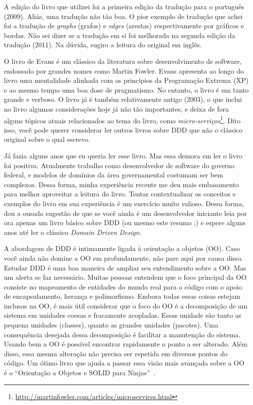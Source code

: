 \documentclass[a4paper, 12pt]{article}
\newcommand{\ddd}{\emph{Domain Driven Design}\xspace}
\begin{document}
A edição do livro que utilizei foi a primeira edição da tradução para o português (2009). Aliás, uma tradução não tão boa. O pior exemplo de tradução que achei foi a tradução de \emph{graphs} (grafos) e \emph{edges} (arestas) respectivamente por gráficos e bordas. Não sei dizer se a tradução em si foi melhorada na segunda edição da tradução (2011). Na dúvida, sugiro a leitura do original em inglês.

O livro de Evans é um clássico da literatura sobre desenvolvimento de software, endossado por grandes nomes como Martin Fowler. Evans apresenta ao longo do livro uma mentalidade alinhada com os princípios da Programação Extrema (XP) e ao mesmo tempo uma boa dose de pragmatismo. No entanto, o livro é um tanto grande e verboso. O livro já é também relativamente antigo (2003), o que inclui no livro algumas considerações hoje já não tão importantes, e deixa de fora alguns tópicos atuais relacionados ao tema do livro, como \emph{micro-serviços}\footnote{\url{http://martinfowler.com/articles/microservices.html}}. Dito isso, você pode querer considerar ler outros livros sobre DDD que não o clássico original sobre o qual escrevo.

Já fazia alguns anos que eu queria ler esse livro. Mas essa demora em ler o livro foi positiva. Atualmente trabalho como desenvolvedor de software do governo federal, e modelos de domínios da área governamental costumam ser bem complexos. Dessa forma, minha experiência recente me deu mais embasamento para melhor aproveitar a leitura do livro. Tentar contextualizar os conceitos e exemplos do livro em sua experiência é um exercício muito valioso. Dessa forma, dou a ousada sugestão de que se você ainda é um desenvolvedor iniciante leia por ora apenas um livro básico sobre DDD (ou mesmo este resumo ;) e espere alguns anos até ler o clássico \ddd.

A abordagem de DDD é intimamente ligada à orientação a objetos (OO). Caso você ainda não domine a OO em profundamente, não pare aqui por causa disso. Estudar DDD é uma boa maneira de ampliar seu entendimento sobre a OO. Mas um alerta se faz necessário. Muitas pessoas entendem que o foco principal da OO consiste no mapeamento de entidades do mundo real para o código com o apoio de encapsulamento, herança e polimorfismo. Embora todas essas coisas estejam inclusas na OO, é mais útil considerar que o foco do OO é a decomposição de um sistema em unidades coesas e fracamente acopladas. Essas unidade são tanto as pequena unidades (classes), quanto as grandes unidades (pacotes). Uma consequência desejada dessa decomposição é facilitar a manutenção do sistema. Usando bem a OO é possível encontrar rapidamente o ponto a ser alterado. Além disso, essa mesma alteração não precisa ser repetida em diversos pontos do código. Um ótimo livro que ajuda a passar essa visão mais avançada sobre a OO é o ``Orientação a Objetos e SOLID para Ninjas''~\cite{Aniche2015Ninjas}.
\end{document}
